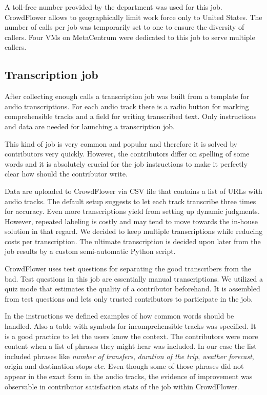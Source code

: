 A toll-free number provided by the department was used for this job.
CrowdFlower allows to geographically limit work force only to United States.
The number of calls per job was temporarily set to one to ensure the diversity of callers.
Four VMs on MetaCentrum were dedicated to this job to serve multiple callers.

\subsection{Transcription job}

After collecting enough calls a transcription job was built from a template for audio transcriptions.
For each audio track there is a radio button for marking comprehensible tracks and a field for writing transcribed text.
Only instructions and data are needed for launching a transcription job.

This kind of job is very common and popular and therefore it is solved by contributors very quickly.
However, the contributors differ on spelling of some words and it is absolutely crucial for the job instructions to make it perfectly clear how should the contributor write.

Data are uploaded to CrowdFlower via CSV file that contains a list of URLs with audio tracks.
The default setup suggests to let each track transcribe three times for accuracy.
Even more transcriptions yield from setting up dynamic judgments.
However, repeated labeling is costly and may tend to move towards the in-house solution in that regard. %
We decided to keep multiple transcriptions while reducing costs per transcription.
The ultimate transcription is decided upon later from the job results by a custom semi-automatic Python script.

CrowdFlower uses test questions for separating the good transcribers from the bad.
Test questions in this job are essentially manual transcriptions.
We utilized a quiz mode that estimates the quality of a contributor beforehand.
It is assembled from test questions and lets only trusted contributors to participate in the job.

In the instructions we defined examples of how common words should be handled.
Also a table with symbols for incomprehensible tracks was specified.
It is a good practice to let the users know the context.
The contributors were more content when a list of phrases they might hear was included.%
In our case the list included phrases like \textit{number of transfers}, \textit{duration of the trip}, \textit{weather forecast}, origin and destination stops etc.
Even though some of those phrases did not appear in the exact form in the audio tracks, the evidence of improvement was observable in contributor satisfaction stats of the job within CrowdFlower.

